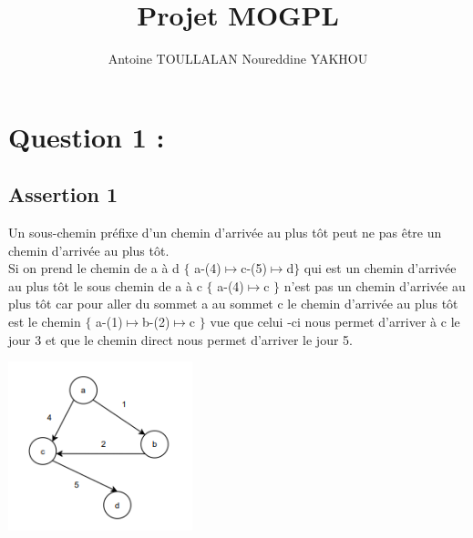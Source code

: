 \documentclass{article}
\title{Projet MOGPL}
\author{Antoine TOULLALAN Noureddine YAKHOU}
\begin{document}
\maketitle

\section*{Question 1 :}

\subsection*{Assertion 1} Un sous-chemin préfixe d’un chemin d’arrivée au plus tôt peut ne pas être un chemin d’arrivée au plus tôt.
\\Si on prend le chemin de a à d $\lbrace$ a-(4)$\mapsto$c-(5)$\mapsto$d$\rbrace$ qui est un chemin d’arrivée au plus tôt le sous chemin de  a à c $\lbrace$ a-(4)$\mapsto$c $\rbrace$ n’est pas un chemin d’arrivée au plus tôt car pour aller du sommet  a au sommet c le chemin d’arrivée au plus tôt est le chemin $\lbrace$ a-(1)$\mapsto$b-(2)$\mapsto$c $\rbrace$ vue que celui -ci nous permet d’arriver à c le jour 3 et que le chemin direct nous permet d’arriver le  jour 5.
\\
\begin{center}
\includegraphics[width=0.4\textwidth]{qp.png}
\end{center}
\\
\end{document}
